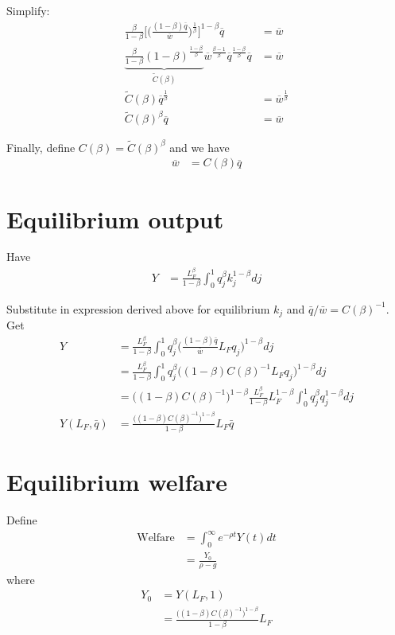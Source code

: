 \documentclass[11pt,english]{article}
\theoremstyle{remark}
\begin{document}
Simplify:
\begin{align*}
	\frac{\beta}{1-\beta} \Big[ \Big( \frac{(1-\beta) \overline{q}}{\overline{w}}\Big)^{\frac{1}{\beta}} \Big]^{1-\beta} \overline{q} &= \overline{w} \\
	\underbrace{\frac{\beta}{1-\beta} (1-\beta)^{\frac{1-\beta}{\beta}}}_{\tilde{C}(\beta)} \overline{w}^{\frac{\beta-1}{\beta}} \overline{q}^{\frac{1-\beta}{\beta}} \overline{q} &= \overline{w} \\
	\tilde{C}(\beta) \overline{q}^{\frac{1}{\beta}} &= \overline{w}^{\frac{1}{\beta}} \\
	\tilde{C}(\beta)^{\beta} \overline{q} &= \overline{w}
\end{align*}

Finally, define $C(\beta) = \tilde{C}(\beta)^{\beta}$ and we have
\begin{align*}
	\overline{w} &= C(\beta) \overline{q}
\end{align*}

\section{Equilibrium output}
Have
\begin{align*}
	Y &= \frac{L_F^{\beta}}{1-\beta} \int_0^1 q_j^{\beta} k_j^{1-\beta} dj
\end{align*}

Substitute in expression derived above for equilibrium $k_j$ and $\bar{q}/\bar{w} = C(\beta)^{-1}$. Get
\begin{align*}
	Y &= \frac{L_F^{\beta}}{1-\beta} \int_0^1 q_j^{\beta} \Big( \frac{(1-\beta)\bar{q}}{\bar{w}}L_F q_j \Big)^{1-\beta} dj \\
	  &= \frac{L_F^{\beta}}{1-\beta} \int_0^1 q_j^{\beta} \Big( (1-\beta)C(\beta)^{-1} L_F q_j \Big)^{1-\beta} dj \\
	  &= \Big((1-\beta)C(\beta)^{-1} \Big)^{1-\beta} \frac{L_F^{\beta}}{1-\beta} L_F^{1-\beta} \int_0^1 q_j^{\beta} q_j^{1-\beta} dj \\
	Y(L_F,\bar{q}) &= \frac{\Big((1-\beta)C(\beta)^{-1} \Big)^{1-\beta} }{1-\beta}L_F \bar{q}
\end{align*}

\section{Equilibrium welfare}
Define
\begin{align*}
	\textrm{Welfare} &= \int_0^{\infty} e^{-\rho t}Y(t) dt \\
	                 &= \frac{Y_0}{\rho - g}
\end{align*}
where 
\begin{align*}
	Y_0 &= Y(L_F,1) \\
	    &= \frac{\Big((1-\beta)C(\beta)^{-1} \Big)^{1-\beta} }{1-\beta}L_F
\end{align*}
\end{document}
